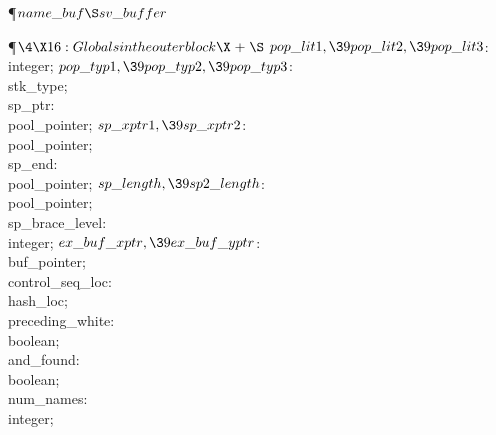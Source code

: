 \Y\P\D {}$\\{name\_buf}\S\\{sv\_buffer}$\par
\Y\P$\4\X16:Globals in the outer block\X\mathrel{+}\S$\6
\4$\\{pop\_lit1},\39\\{pop\_lit2},\39\\{pop\_lit3}$: \\{integer};\6
\4$\\{pop\_typ1},\39\\{pop\_typ2},\39\\{pop\_typ3}$: \\{stk\_type};\6
\4\\{sp\_ptr}: \\{pool\_pointer};\6
\4$\\{sp\_xptr1},\39\\{sp\_xptr2}$: \\{pool\_pointer};\6
\4\\{sp\_end}: \\{pool\_pointer};%
\6
\4$\\{sp\_length},\39\\{sp2\_length}$: \\{pool\_pointer};\6
\4\\{sp\_brace\_level}: \\{integer};\6
\4$\\{ex\_buf\_xptr},\39\\{ex\_buf\_yptr}$: \\{buf\_pointer};\6
\4\\{control\_seq\_loc}: \\{hash\_loc};\6
\4\\{preceding\_white}: \\{boolean};\6
\4\\{and\_found}: \\{boolean};%
\6
\4\\{num\_names}: \\{integer};\6
